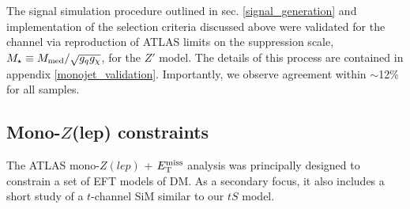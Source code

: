 The signal simulation procedure outlined in sec. \ref{signal_generation} and implementation of the selection criteria discussed above were validated for the \monojet channel via reproduction of ATLAS limits on the suppression scale, $M_{\star} \equiv M_{\mathrm{med}} / \sqrt{g_q g_{\chi}}$, for the $Z'$ model. The details of this process are contained in appendix \ref{monojet_validation}. Importantly, we observe agreement within $\sim$12\% for all samples.



\subsection{Mono-$Z$(lep) constraints}
\label{monoZ_constraints}
The ATLAS mono-$Z(lep)$ + $E_{\mathrm{T}}^{\mathrm{miss}}$ analysis \cite{Aad:2014monoZlep} was principally designed to constrain a set of EFT models of DM. As a secondary focus, it also includes a short study of a $t$-channel SiM similar to our $tS$ model.

